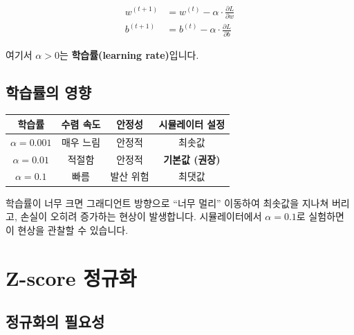 \documentclass[11pt,a4paper]{article}
\begin{document}
\begin{tcolorbox}[colback=lightgreen,colframe=green!50!black,title=\textbf{\texttwemoji{counterclockwise arrows button} 경사 하강법 업데이트}]
\begin{align}
w^{(t+1)} &= w^{(t)} - \alpha \cdot \frac{\partial L}{\partial w} \\[0.5em]
b^{(t+1)} &= b^{(t)} - \alpha \cdot \frac{\partial L}{\partial b}
\end{align}

여기서 $\alpha > 0$는 \textbf{학습률(learning rate)}입니다.
\end{tcolorbox}

\subsection{학습률의 영향}

\begin{center}
\begin{tabular}{|c|c|c|c|}
\hline
\textbf{학습률} & \textbf{수렴 속도} & \textbf{안정성} & \textbf{시뮬레이터 설정} \\
\hline
$\alpha = 0.001$ & 매우 느림 & 안정적 & 최솟값 \\
$\alpha = 0.01$ & 적절함 & 안정적 & \textbf{기본값 (권장)} \\
$\alpha = 0.1$ & 빠름 & 발산 위험 & 최댓값 \\
\hline
\end{tabular}
\end{center}

\begin{tcolorbox}[colback=lightyellow,colframe=orange,title=\textbf{\texttwemoji{warning} 발산 현상 설명}]
학습률이 너무 크면 그래디언트 방향으로 ``너무 멀리'' 이동하여 
최솟값을 지나쳐 버리고, 손실이 오히려 증가하는 현상이 발생합니다.
시뮬레이터에서 $\alpha = 0.1$로 실험하면 이 현상을 관찰할 수 있습니다.
\end{tcolorbox}

\section{ Z-score 정규화}

\subsection{정규화의 필요성}
\end{document}
